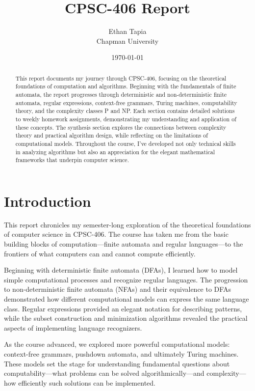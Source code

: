 \documentclass{article}
\title{CPSC-406 Report}
\author{Ethan Tapia  \\ Chapman University}
\date{\today}
\theoremstyle{theorem}
\theoremstyle{definition}
\theoremstyle{remark}
\begin{document}
\maketitle

\begin{abstract}
This report documents my journey through CPSC-406, focusing on the theoretical foundations of computation and algorithms. Beginning with the fundamentals of finite automata, the report progresses through deterministic and non-deterministic finite automata, regular expressions, context-free grammars, Turing machines, computability theory, and the complexity classes P and NP. Each section contains detailed solutions to weekly homework assignments, demonstrating my understanding and application of these concepts. The synthesis section explores the connections between complexity theory and practical algorithm design, while reflecting on the limitations of computational models. Throughout the course, I've developed not only technical skills in analyzing algorithms but also an appreciation for the elegant mathematical frameworks that underpin computer science.
\end{abstract}

\setcounter{tocdepth}{3}
\tableofcontents

\section{Introduction}\label{intro}
This report chronicles my semester-long exploration of the theoretical foundations of computer science in CPSC-406. The course has taken me from the basic building blocks of computation—finite automata and regular languages—to the frontiers of what computers can and cannot compute efficiently.

Beginning with deterministic finite automata (DFAs), I learned how to model simple computational processes and recognize regular languages. The progression to non-deterministic finite automata (NFAs) and their equivalence to DFAs demonstrated how different computational models can express the same language class. Regular expressions provided an elegant notation for describing patterns, while the subset construction and minimization algorithms revealed the practical aspects of implementing language recognizers.

As the course advanced, we explored more powerful computational models: context-free grammars, pushdown automata, and ultimately Turing machines. These models set the stage for understanding fundamental questions about computability—what problems can be solved algorithmically—and complexity—how efficiently such solutions can be implemented.
\end{document}
